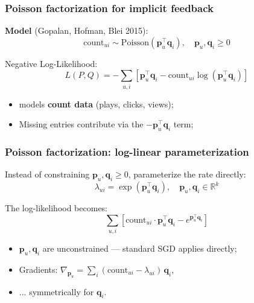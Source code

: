 \documentclass[]{beamer}
\begin{document}
\begin{frame}[fragile]
\frametitle{Poisson factorization for implicit feedback}
\textbf{Model} (Gopalan, Hofman, Blei 2015):
\begin{equation*}
\mathrm{count}_{ui} \sim \mathrm{Poisson}\!\left(\mathbf{p}_u^\top \mathbf{q}_i\right), \quad \mathbf{p}_u, \mathbf{q}_i \geq 0
\end{equation*}

Negative Log-Likelihood:
\begin{equation*}
L(P, Q) = -\sum_{u,i} \left[ \mathbf{p}_u^\top \mathbf{q}_i - \mathrm{count}_{ui} \log(\mathbf{p}_u^\top \mathbf{q}_i) \right]
\end{equation*}

\begin{itemize}
  \item models \textbf{count data} (plays, clicks, views);
  \item Missing entries contribute via the $-\mathbf{p}_u^\top \mathbf{q}_i$ term;
\end{itemize}

\end{frame}

\begin{frame}[fragile]
\frametitle{Poisson factorization: log-linear parameterization}
Instead of constraining $\mathbf{p}_u, \mathbf{q}_i \geq 0$, parameterize the rate directly:
\begin{equation*}
\lambda_{ui} = \exp\!\left(\mathbf{p}_u^\top \mathbf{q}_i\right), \quad \mathbf{p}_u, \mathbf{q}_i \in \mathbb{R}^k
\end{equation*}

The log-likelihood becomes:
\begin{equation*}
\sum_{u,i} \left[ \mathrm{count}_{ui} \cdot \mathbf{p}_u^\top \mathbf{q}_i - e^{\mathbf{p}_u^\top \mathbf{q}_i} \right]
\end{equation*}

\begin{itemize}
  \item $\mathbf{p}_u, \mathbf{q}_i$ are unconstrained --- standard SGD applies directly;
  \item Gradients: $\nabla_{\mathbf{p}_u} = \sum_i (\mathrm{count}_{ui} - \lambda_{ui})\,\mathbf{q}_i$,
  \item ... symmetrically for $\mathbf{q}_i$.
\end{itemize}

\end{frame}
\end{document}
